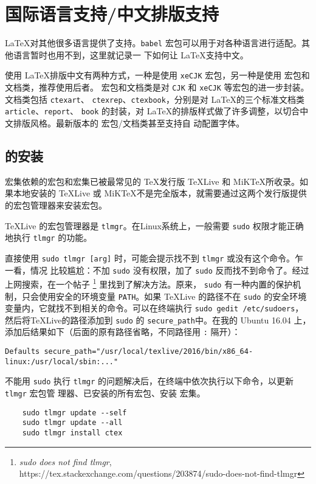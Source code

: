 \documentclass[UTF8]{ctexart}
\begin{document}
\section{国际语言支持/中文排版支持}
\LaTeX 对其他很多语言提供了支持。\texttt{babel} 宏包可以用于对各种语言进行适配。其他语言暂时也用不到，这里就记录一
下如何让 \LaTeX 支持中文。

使用 \LaTeX 排版中文有两种方式，一种是使用 \texttt{xeCJK} 宏包，另一种是使用 \CTeX 宏包和文档类，推荐使用后者。
\CTeX 宏包和文档类是对 \texttt{CJK} 和 \texttt{xeCJK} 等宏包的进一步封装。文档类包括 \texttt{ctexart}、
\texttt{ctexrep}、\texttt{ctexbook}，分别是对 \LaTeX 的三个标准文档类 \texttt{article}、\texttt{report}、
\texttt{book} 的封装，对 \LaTeX 的排版样式做了许多调整，以切合中文排版风格。最新版本的 \CTeX 宏包/文档类甚至支持自
动配置字体。

\subsection{\CTeX 的安装}
\CTeX 宏集依赖的宏包和宏集已被最常见的 \TeX 发行版 \TeX Live 和 MiK\TeX 所收录。如果本地安装的 \TeX Live 或
MiK\TeX 不是完全版本，就需要通过这两个发行版提供的宏包管理器来安装宏包。

\TeX Live 的宏包管理器是 \texttt{tlmgr}。在Linux系统上，一般需要 \texttt{sudo} 权限才能正确地执行
\texttt{tlmgr} 的功能。

直接使用 \texttt{sudo tlmgr [arg]} 时，可能会提示找不到 \texttt{tlmgr} 或没有这个命令。乍一看，情况
比较尴尬：不加 \texttt{sudo} 没有权限，加了 \texttt{sudo} 反而找不到命令了。经过上网搜索，在一个帖子
\footnote{\emph{sudo does not find tlmgr},
https://tex.stackexchange.com/questions/203874/sudo-does-not-find-tlmgr} 里找到了解决方法。原来，
\texttt{sudo} 有一种内置的保护机制，只会使用安全的环境变量 \texttt{PATH}。如果 \TeX Live 的路径不在
\texttt{sudo} 的安全环境变量内，它就找不到相关的命令。可以在终端执行
\texttt{sudo gedit /etc/sudoers}，然后将\TeX Live的路径添加到 \texttt{sudo} 的
\texttt{secure\_path}中。在我的 Ubuntu 16.04 上，添加后结果如下（后面的原有路径省略，不同路径用 \texttt{:}
隔开）：
\begin{verbatim}
Defaults secure_path="/usr/local/texlive/2016/bin/x86_64-linux:/usr/local/sbin:..."
\end{verbatim}

不能用 \texttt{sudo} 执行 \texttt{tlmgr} 的问题解决后，在终端中依次执行以下命令，以更新 \texttt{tlmgr} 宏包管
理器、已安装的所有宏包、安装 \CTeX 宏集。
\begin{verbatim}
    sudo tlmgr update --self
    sudo tlmgr update --all
    sudo tlmgr install ctex
\end{verbatim}
\end{document}
